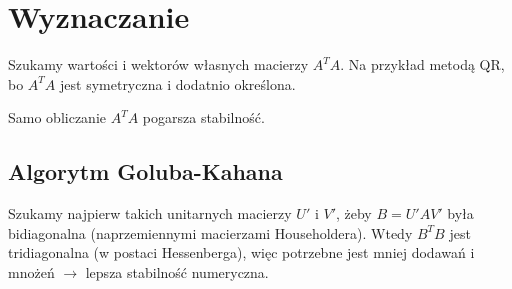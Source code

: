 \section{Wyznaczanie}
Szukamy wartości i wektorów własnych macierzy \( A^TA \). Na przykład metodą QR, bo \( A^TA \) jest symetryczna i dodatnio określona.
\begin{warning}
	Samo obliczanie \( A^TA \) pogarsza stabilność.
\end{warning}

\subsection{Algorytm Goluba-Kahana}
Szukamy najpierw takich unitarnych macierzy \( U' \) i \( V' \), żeby \( B = U'AV' \) była bidiagonalna (naprzemiennymi macierzami Householdera). Wtedy \( B^TB \) jest tridiagonalna (w postaci Hessenberga), więc potrzebne jest mniej dodawań i mnożeń \( \rightarrow \) lepsza stabilność numeryczna.